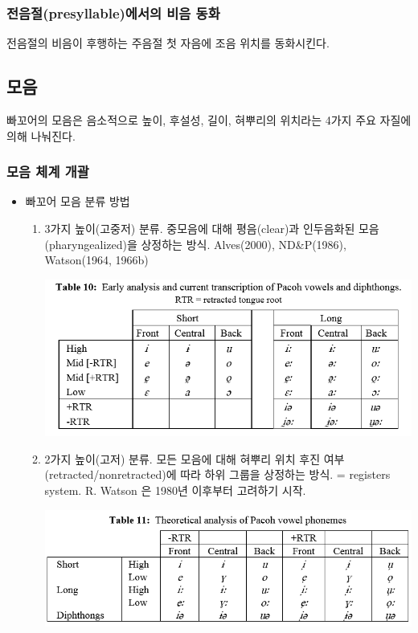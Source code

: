 \subsubsection{전음절(presyllable)에서의 비음 동화}
전음절의 비음이 후행하는 주음절 첫 자음에 조음 위치를 동화시킨다.

\subsection{모음}
빠꼬어의 모음은 음소적으로 높이, 후설성, 길이, 혀뿌리의 위치라는 4가지 주요 자질에 의해 나눠진다.
\subsubsection{모음 체계 개괄}
\begin{itemize}
\item 빠꼬어 모음 분류 방법
\begin{enumerate}
\item 3가지 높이(고중저) 분류. 중모음에 대해 평음(clear)과 인두음화된 모음(pharyngealized)을 상정하는 방식. Alves(2000), ND\&P(1986), Watson(1964, 1966b)
\begin{center}
\includegraphics[width=\linewidth]{Pacoh/src/PacohTable10.png}
\end{center}

\item 2가지 높이(고저) 분류. 모든 모음에 대해 혀뿌리 위치 후진 여부(retracted/nonretracted)에 따라 하위 그룹을 상정하는 방식. = registers system. R. Watson 은 1980년 이후부터 고려하기 시작.
\begin{center}
\includegraphics[width=\linewidth]{Pacoh/src/PacohTable11.png}
\end{center}
\end{enumerate}


\end{itemize}
